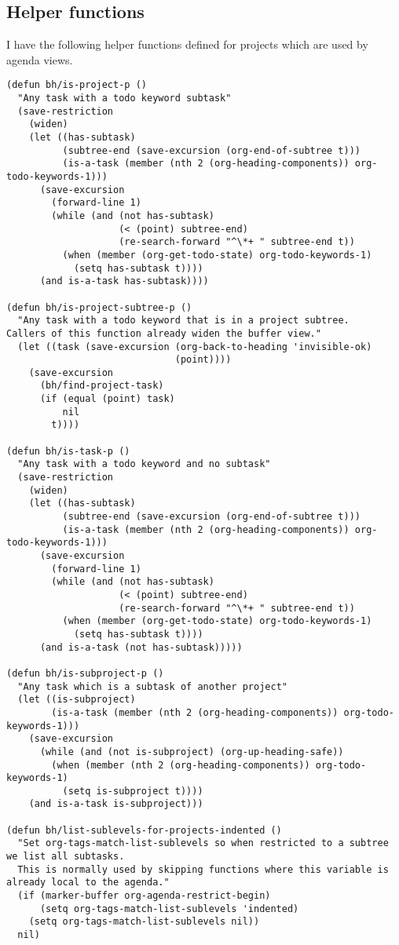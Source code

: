 \documentclass[11pt]{scrartcl}
\begin{document}
\subsection{Helper functions}
\label{sec:orgheadline40}
I have the following helper functions defined for projects which are
used by agenda views.
\begin{verbatim}
(defun bh/is-project-p ()
  "Any task with a todo keyword subtask"
  (save-restriction
    (widen)
    (let ((has-subtask)
          (subtree-end (save-excursion (org-end-of-subtree t)))
          (is-a-task (member (nth 2 (org-heading-components)) org-todo-keywords-1)))
      (save-excursion
        (forward-line 1)
        (while (and (not has-subtask)
                    (< (point) subtree-end)
                    (re-search-forward "^\*+ " subtree-end t))
          (when (member (org-get-todo-state) org-todo-keywords-1)
            (setq has-subtask t))))
      (and is-a-task has-subtask))))

(defun bh/is-project-subtree-p ()
  "Any task with a todo keyword that is in a project subtree.
Callers of this function already widen the buffer view."
  (let ((task (save-excursion (org-back-to-heading 'invisible-ok)
                              (point))))
    (save-excursion
      (bh/find-project-task)
      (if (equal (point) task)
          nil
        t))))

(defun bh/is-task-p ()
  "Any task with a todo keyword and no subtask"
  (save-restriction
    (widen)
    (let ((has-subtask)
          (subtree-end (save-excursion (org-end-of-subtree t)))
          (is-a-task (member (nth 2 (org-heading-components)) org-todo-keywords-1)))
      (save-excursion
        (forward-line 1)
        (while (and (not has-subtask)
                    (< (point) subtree-end)
                    (re-search-forward "^\*+ " subtree-end t))
          (when (member (org-get-todo-state) org-todo-keywords-1)
            (setq has-subtask t))))
      (and is-a-task (not has-subtask)))))

(defun bh/is-subproject-p ()
  "Any task which is a subtask of another project"
  (let ((is-subproject)
        (is-a-task (member (nth 2 (org-heading-components)) org-todo-keywords-1)))
    (save-excursion
      (while (and (not is-subproject) (org-up-heading-safe))
        (when (member (nth 2 (org-heading-components)) org-todo-keywords-1)
          (setq is-subproject t))))
    (and is-a-task is-subproject)))

(defun bh/list-sublevels-for-projects-indented ()
  "Set org-tags-match-list-sublevels so when restricted to a subtree we list all subtasks.
  This is normally used by skipping functions where this variable is already local to the agenda."
  (if (marker-buffer org-agenda-restrict-begin)
      (setq org-tags-match-list-sublevels 'indented)
    (setq org-tags-match-list-sublevels nil))
  nil)


\end{verbatim}
\end{document}
